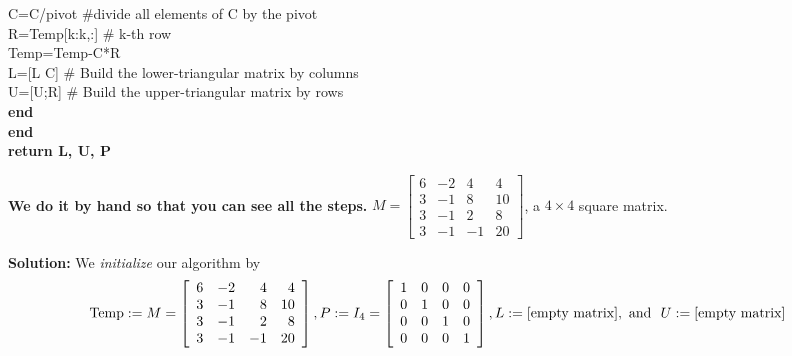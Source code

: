 \begin{tcolorbox}[sharp corners, colback=green!30, colframe=green!80!blue, title=\textbf{\Large LU Factorization of Square Matrices}]
\hspace*{.6cm}     C=C/pivot \#divide all elements of C by the pivot \\
\hspace*{.6cm}     R={\rm Temp}[k:k,:] \# k-th row\\
\hspace*{.6cm}      {\rm Temp}={\rm Temp}-C*R \\
\hspace*{.6cm}      L=[L C]  \# Build the lower-triangular matrix by columns\\
\hspace*{.6cm}     U=[U;R] \# Build the upper-triangular matrix by rows \\
\hspace*{.3cm} \textbf{end}\\
\textbf{end} \\
\textbf{return L, U, P}

\end{tcolorbox}
   
\newpage

 
\begin{example}
\label{ex:SolveUsingLu03} 
\textbf{We do it by hand so that you can see all the steps.} $M=\left[\begin{array}{rrrr} 6 & -2 & 4 & 4\\
3 & -1 & 8 & 10 \\ 3 & -1 & 2 & 8 \\3 & -1 & -1 & 20 \end{array}\right]$, a $4 \times 4$ square matrix. 
\end{example}

\textbf{Solution:} We \textit{initialize} our algorithm by 
$${\rm Temp}:= M =\left[\begin{array}{rrrr} 6 & -2 & 4 & 4\\ 3 & -1 & 8 & 10 \\ 3 & -1 & 2 & 8 \\3 & -1 & -1 & 20 \end{array}\right], P:= I_4 =\left[\begin{array}{rrrr} 1 & 0 & 0 & 0\\ 0 & 1 & 0 & 0 \\ 0 & 0 & 1 & 0 \\0 & 0 & 0 & 1 \end{array}\right], L:=[\textrm{empty matrix}],~\text{and}~~ U:=[\textrm{empty matrix}]$$

